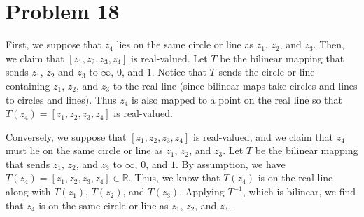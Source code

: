 \documentclass[12pt]{article}
\newcommand{\rr}{{\mathbb R}}
\begin{document}
\section*{Problem 18}
First, we suppose that $z_4$ lies on the same circle or line as $z_1$, $z_2$, and $z_3$. Then, we claim that $[z_1,z_2,z_3,z_4]$ is real-valued. Let $T$ be the bilinear mapping that sends $z_1$, $z_2$ and $z_3$ to $\infty$, $0$, and $1$. Notice that $T$ sends the circle or line containing $z_1$, $z_2$, and $z_3$ to the real line (since bilinear maps take circles and lines to circles and lines). Thus $z_4$ is also mapped to a point on the real line so that $T(z_4) = [z_1,z_2,z_3,z_4]$ is real-valued. 

Conversely, we suppose that  $[z_1,z_2,z_3,z_4]$ is real-valued, and we claim that $z_4$ must lie on the same circle or line as $z_1$, $z_2$, and $z_3$. Let $T$ be the bilinear mapping that sends $z_1$, $z_2$, and $z_3$ to $\infty$, $0$, and $1$. By assumption, we have $T(z_4) = [z_1,z_2,z_3,z_4] \in \rr$. Thus, we know that $T(z_4)$ is on the real line along with $T(z_1)$, $T(z_2)$, and $T(z_3)$. Applying $T^{-1}$, which is bilinear, we find that $z_4$ is on the same circle or line as $z_1$, $z_2$, and $z_3$.
\end{document}
